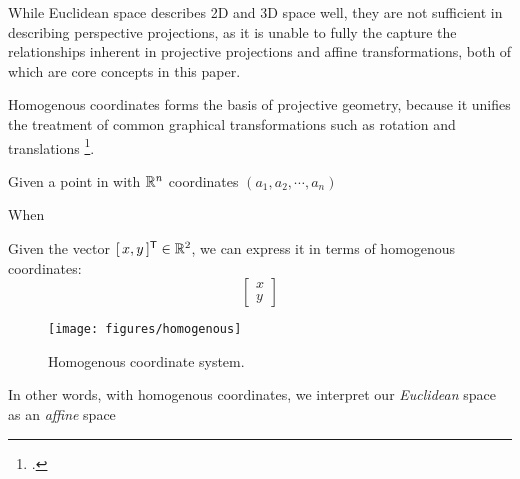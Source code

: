 While Euclidean space describes 2D and 3D space well, they are not sufficient in describing perspective projections, as it is unable to fully the capture the relationships inherent in projective projections and affine transformations, both of which are core concepts in this paper. 

Homogenous coordinates forms the basis of projective geometry, because it unifies the treatment of common graphical transformations such as rotation and translations \footcite[][1]{bloomenthalHomogeneousCoordinates1994}. 

Given a point in with $\mathbb{R}^n$ coordinates $(a_1, a_2, \cdots, a_n)$

When



Given the vector $[\,x, y\,]^{\mathsf{T}} \in \mathbb{R}^2$, we can express it in terms of homogenous coordinates: 
\begin{equation}
    \begin{bmatrix}
        x \\ y
    \end{bmatrix}
\end{equation}

\begin{figure}[H]
    \centering
    \texttt{[image: figures/homogenous]}
    \caption{Homogenous coordinate system.}
\end{figure}

In other words, with homogenous coordinates, we interpret our \emph{Euclidean} space as an \emph{affine} space
